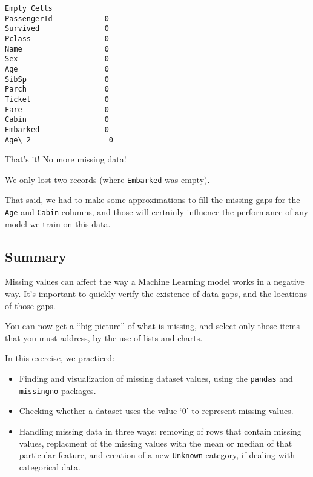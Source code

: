 \documentclass[11pt]{article}
\providecommand{\tightlist}{%
      \setlength{\itemsep}{0pt}\setlength{\parskip}{0pt}}
\begin{document}
    \begin{Verbatim}[commandchars=\\\{\}]
             Empty Cells
PassengerId            0
Survived               0
Pclass                 0
Name                   0
Sex                    0
Age                    0
SibSp                  0
Parch                  0
Ticket                 0
Fare                   0
Cabin                  0
Embarked               0
Age\_2                  0
    \end{Verbatim}

    That's it! No more missing data!

We only lost two records (where \texttt{Embarked} was empty).

That said, we had to make some approximations to fill the missing gaps
for the \texttt{Age} and \texttt{Cabin} columns, and those will
certainly influence the performance of any model we train on this data.

\hypertarget{summary}{%
\subsection{Summary}\label{summary}}

Missing values can affect the way a Machine Learning model works in a
negative way. It's important to quickly verify the existence of data
gaps, and the locations of those gaps.

You can now get a ``big picture'' of what is missing, and select only
those items that you must address, by the use of lists and charts.

In this exercise, we practiced:

\begin{itemize}
\tightlist
\item
  Finding and visualization of missing dataset values, using the
  \texttt{pandas} and \texttt{missingno} packages.
\item
  Checking whether a dataset uses the value `0' to represent missing
  values.
\item
  Handling missing data in three ways: removing of rows that contain
  missing values, replacment of the missing values with the mean or
  median of that particular feature, and creation of a new
  \texttt{Unknown} category, if dealing with categorical data.
\end{itemize}


    
    
    
\end{document}
